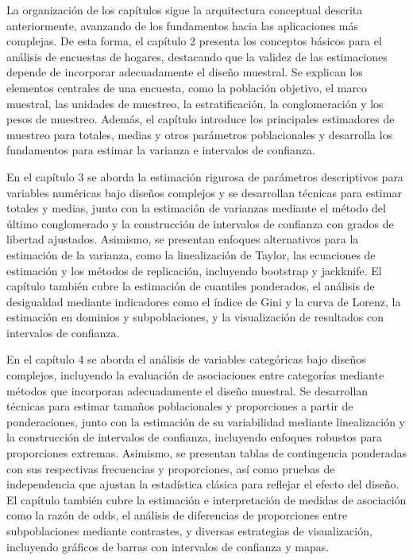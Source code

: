 \documentclass[
  spanish,
  12pt,
]{book}
\begin{document}
La organización de los capítulos sigue la arquitectura conceptual descrita anteriormente, avanzando de los fundamentos hacia las aplicaciones más complejas. De esta forma, el capítulo 2 presenta los conceptos básicos para el análisis de encuestas de hogares, destacando que la validez de las estimaciones depende de incorporar adecuadamente el diseño muestral. Se explican los elementos centrales de una encuesta, como la población objetivo, el marco muestral, las unidades de muestreo, la estratificación, la conglomeración y los pesos de muestreo. Además, el capítulo introduce los principales estimadores de muestreo para totales, medias y otros parámetros poblacionales y desarrolla los fundamentos para estimar la varianza e intervalos de confianza.

En el capítulo 3 se aborda la estimación rigurosa de parámetros descriptivos para variables numéricas bajo diseños complejos y se desarrollan técnicas para estimar totales y medias, junto con la estimación de varianzas mediante el método del último conglomerado y la construcción de intervalos de confianza con grados de libertad ajustados. Asimismo, se presentan enfoques alternativos para la estimación de la varianza, como la linealización de Taylor, las ecuaciones de estimación y los métodos de replicación, incluyendo bootstrap y jackknife. El capítulo también cubre la estimación de cuantiles ponderados, el análisis de desigualdad mediante indicadores como el índice de Gini y la curva de Lorenz, la estimación en dominios y subpoblaciones, y la visualización de resultados con intervalos de confianza.

En el capítulo 4 se aborda el análisis de variables categóricas bajo diseños complejos, incluyendo la evaluación de asociaciones entre categorías mediante métodos que incorporan adecuadamente el diseño muestral. Se desarrollan técnicas para estimar tamaños poblacionales y proporciones a partir de ponderaciones, junto con la estimación de su variabilidad mediante linealización y la construcción de intervalos de confianza, incluyendo enfoques robustos para proporciones extremas. Asimismo, se presentan tablas de contingencia ponderadas con sus respectivas frecuencias y proporciones, así como pruebas de independencia que ajustan la estadística clásica para reflejar el efecto del diseño. El capítulo también cubre la estimación e interpretación de medidas de asociación como la razón de odds, el análisis de diferencias de proporciones entre subpoblaciones mediante contrastes, y diversas estrategias de visualización, incluyendo gráficos de barras con intervalos de confianza y mapas.
\end{document}
